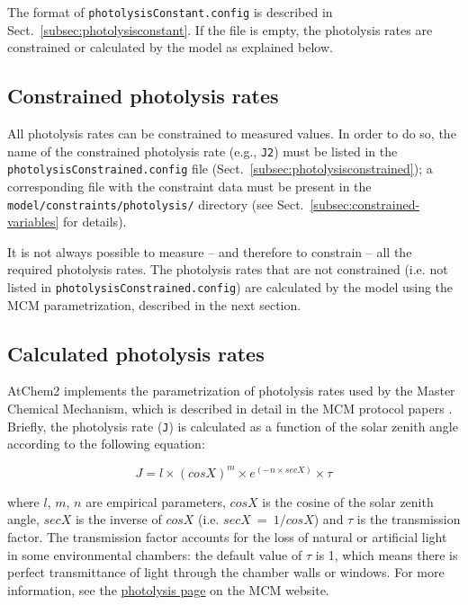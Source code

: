 The format of \texttt{photolysisConstant.config} is described in
Sect.~\ref{subsec:photolysisconstant}. If the file is empty, the
photolysis rates are constrained or calculated by the model as
explained below.

\subsection{Constrained photolysis rates} \label{subsec:constrained-photolysis-rates}

All photolysis rates can be constrained to measured values. In order
to do so, the name of the constrained photolysis rate (e.g., \texttt{J2})
must be listed in the \texttt{photolysisConstrained.config} file
(Sect.~\ref{subsec:photolysisconstrained}); a corresponding file with the
constraint data must be present in the \texttt{model/constraints/photolysis/}
directory (see Sect.~\ref{subsec:constrained-variables} for details).

It is not always possible to measure -- and therefore to constrain --
all the required photolysis rates. The photolysis rates that are not
constrained (i.e. not listed in \texttt{photolysisConstrained.config})
are calculated by the model using the MCM parametrization, described
in the next section.

\subsection{Calculated photolysis rates} \label{subsec:calculated-photolysis-rates}

AtChem2 implements the parametrization of photolysis rates used by the
Master Chemical Mechanism, which is described in detail in the MCM
protocol papers \citep{jenkin_1997, saunders_2003}. Briefly, the
photolysis rate (\texttt{J}) is calculated as a function of the solar
zenith angle according to the following equation:

\begin{equation}
  J = l \times (cosX)^m \times e^{(-n \times secX)} \times \tau
\end{equation}

where $l$, $m$, $n$ are empirical parameters, $cosX$ is the cosine of
the solar zenith angle, $secX$ is the inverse of $cosX$ (i.e.
$secX\ =\ 1/cosX$) and $\tau$ is the transmission factor. The
transmission factor accounts for the loss of natural or artificial
light in some environmental chambers: the default value of $\tau$ is
1, which means there is perfect transmittance of light through the
chamber walls or windows. For more information, see the
\href{https://mcm.york.ac.uk/MCM/rates/photolysis}{photolysis page} on
the MCM website.

